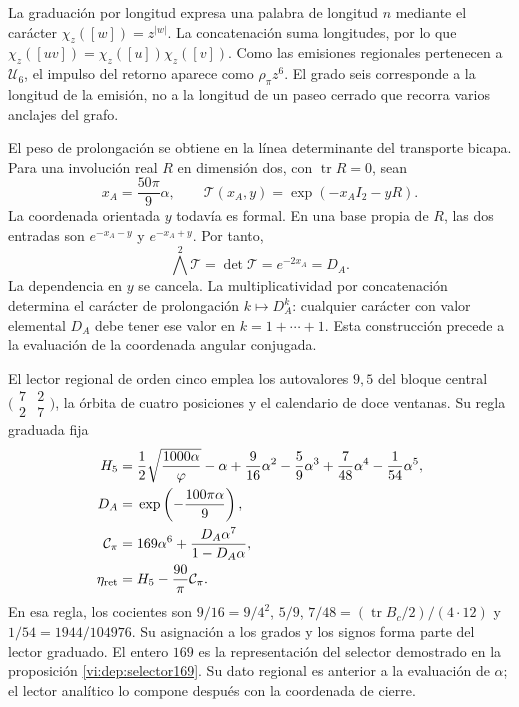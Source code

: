 La graduación por longitud expresa una palabra de longitud \(n\)
mediante el carácter \(\chi_z([w])=z^{|w|}\). La concatenación
suma longitudes, por lo que
\(\chi_z([uv])=\chi_z([u])\chi_z([v])\). Como las emisiones
regionales pertenecen a \(\mathcal U_6\), el impulso del retorno
aparece como \(\rho_\pi z^6\). El grado seis corresponde a la
longitud de la emisión, no a la longitud de un paseo cerrado que
recorra varios anclajes del grafo.

El peso de prolongación se obtiene en la línea determinante del
transporte bicapa. Para una involución real \(R\) en dimensión dos,
con \(\operatorname{tr}R=0\), sean
\[
 x_A=\frac{50\pi}{9}\alpha,\qquad
 \mathcal T(x_A,y)=\exp(-x_AI_2-yR).
\]
La coordenada orientada \(y\) todavía es formal. En una base propia
de \(R\), las dos entradas son \(e^{-x_A-y}\) y
\(e^{-x_A+y}\). Por tanto,
\[
 \bigwedge^2\mathcal T=\det\mathcal T
 =e^{-2x_A}=D_A.
\]
La dependencia en \(y\) se cancela. La multiplicatividad por
concatenación determina el carácter de prolongación \(k\mapsto D_A^k\):
cualquier carácter con valor elemental \(D_A\) debe tener ese valor
en \(k=1+\cdots+1\). Esta construcción precede a la evaluación
de la coordenada angular conjugada.

El lector regional de orden cinco emplea los autovalores \(9,5\)
del bloque central \(\bigl(\begin{smallmatrix}7&2\\2&7\end{smallmatrix}\bigr)\),
la órbita de cuatro posiciones y el calendario de doce ventanas.
Su regla graduada fija
\begin{align}
 H_5={}&\frac12\sqrt{\frac{1000\alpha}{\varphi}}-\alpha
       +\frac9{16}\alpha^2-\frac59\alpha^3
       +\frac7{48}\alpha^4-\frac1{54}\alpha^5,\notag\\
 D_A={}&\exp\left(-\frac{100\pi\alpha}{9}\right),\notag\\
 \mathcal C_\pi={}&169\alpha^6+
                  \frac{D_A\alpha^7}{1-D_A\alpha},\notag\\
 \eta_{\rm ret}={}&H_5-\frac{90}{\pi}\mathcal C_\pi.
 \label{vi:dep:mantisas}
\end{align}
En esa regla, los cocientes son
\(9/16=9/4^2\), \(5/9\), \(7/48=(\operatorname{tr}B_c/2)/(4\cdot12)\)
y \(1/54=1944/104976\). Su asignación a los grados y los signos
forma parte del lector graduado. El entero \(169\) es la representación
del selector demostrado en la proposición \ref{vi:dep:selector169}.
Su dato regional es anterior a la evaluación de \(\alpha\); el
lector analítico lo compone después con la coordenada de cierre.


